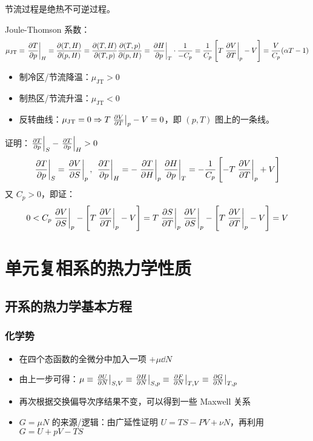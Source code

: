 节流过程是绝热不可逆过程。

Joule-Thomson 系数：
\[
\mu_{\text{JT}} = \left.\pdv{T}{p}\right|_H = \pdv{(T, H)}{(p, H)} = \pdv{(T, H)}{(T, p)} \pdv{(T, p)}{(p, H)} = \left.\pdv{H}{p}\right|_T \cdot \frac{1}{- C_p} = \frac{1}{C_p} \left[T \left.\pdv{V}{T}\right|_p - V\right] = \frac{V}{C_p} (\alpha T - 1)
\]

\begin{itemize}
    \item 制冷区/节流降温：$\mu_{\text{JT}} > 0$
    \item 制热区/节流升温：$\mu_{\text{JT}} < 0$
    \item 反转曲线：$\mu_{\text{JT}} = 0 \Rightarrow T \left.\pdv{V}{T}\right|_p - V = 0$，即 $(p, T)$ 图上的一条线。
\end{itemize}

\begin{framed}
证明：$\left.\pdv{T}{p}\right|_S - \left.\pdv{T}{p}\right|_H > 0$
\[
\left.\pdv{T}{p}\right|_S = \left.\pdv{V}{S}\right|_p,\ \left.\pdv{T}{p}\right|_H = - \left.\pdv{T}{H}\right|_p \left.\pdv{H}{p}\right|_T = - \frac{1}{C_p} \left[- T \left.\pdv{V}{T}\right|_p + V\right]
\]
又 $C_p > 0$，即证：
\[
0 < C_p \left.\pdv{V}{S}\right|_p - \left[T \left.\pdv{V}{T}\right|_p - V\right] = T \left.\pdv{S}{T}\right|_p \left.\pdv{V}{S}\right|_p - \left[T \left.\pdv{V}{T}\right|_p - V\right] = V
\]
\end{framed}

\section{单元复相系的热力学性质}

\subsection{开系的热力学基本方程}

\subsubsection{化学势}
\begin{itemize}
    \item 在四个态函数的全微分中加入一项 $+ \mu \dd{N}$
    \item 由上一步可得：$\mu \equiv \left.\pdv{U}{N}\right|_{S, V} \equiv \left.\pdv{H}{N}\right|_{S, p} \equiv \left.\pdv{F}{N}\right|_{T, V} \equiv \left.\pdv{G}{N}\right|_{T, p}$
    \item 再次根据交换偏导次序结果不变，可以得到一些 Maxwell 关系
    \item $G = \mu N$ 的来源/逻辑：由广延性证明 $U = T S - P V + \nu N$，再利用 $G = U + p V - T S$
\end{itemize}

